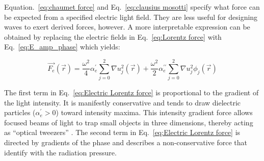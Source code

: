 Equation.~\eqref{eq:chaumet force} and Eq.~\eqref{eq:clausius mosotti} specify what force can be expected from a specified electric light field. They are less useful for designing waves to exert derived forces, however. A more interpretable expression can be obtained by replacing the electric fields in Eq.~\eqref{eq:Lorentz force} with Eq.~\eqref{eq:E_amp_phase} which yields:

\begin{equation}
\label{eq:Electric Lorentz force}
\vec{F_e}(\vec{r}) = \frac{\omega ^2}{4}\alpha ^{\prime} _{e} \sum _{j=0}^{2}\nabla u_{j}^{2}(\vec{r}) + \frac{\omega ^2}{2} \alpha ^{\prime \prime}_{e} \sum _{j=0}^{2} \nabla u_{j}^{2}\phi _{j}(\vec{r})
\end{equation}

The first term in Eq.~\eqref{eq:Electric Lorentz force} is proportional to the gradient of the light intensity. It is manifestly conservative and tends to draw dielectric particles ($\alpha _{e}^{\prime}>0$) toward intensity maxima. This intensity gradient force allows focused beams of light to trap small objects in three dimensions, thereby acting as ``optical tweezers'' \cite{Ashkin:86}. The second term in Eq.~\eqref{eq:Electric Lorentz force} is directed by gradients of the phase and describes a non-conservative force that identify with the radiation pressure.


